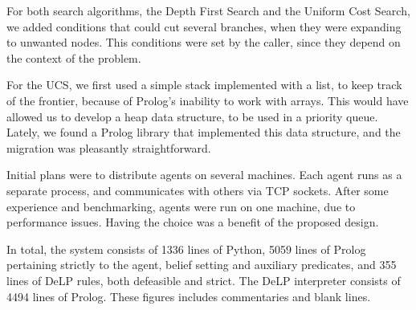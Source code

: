     For both search algorithms, the Depth First Search and the Uniform Cost 
    Search, we added conditions that could cut several branches, when they were 
    expanding to unwanted nodes. This conditions were set by the caller, since 
    they depend on the context of the problem.

    For the UCS, we first used a simple stack implemented with a list, to keep 
    track of the frontier, because of Prolog's inability to work with arrays. This 
    would have allowed us to develop a heap data structure, to be used in a 
    priority queue. Lately, we found a Prolog library that implemented this data 
    structure, and the migration was pleasantly straightforward.

    Initial plans were to distribute agents on several machines. Each agent runs 
    as a separate process, and communicates with others via TCP sockets. After 
    some experience and benchmarking, agents were run on one machine, due to 
    performance issues. 
    Having the choice was a benefit of the proposed design.

In total, the system consists of 1336 lines of Python, 5059 lines of Prolog
pertaining strictly to the agent, belief setting and auxiliary predicates, and
355 lines of DeLP rules, both defeasible and strict.  The DeLP interpreter
consists of 4494 lines of Prolog. These figures includes commentaries and blank
lines. 

